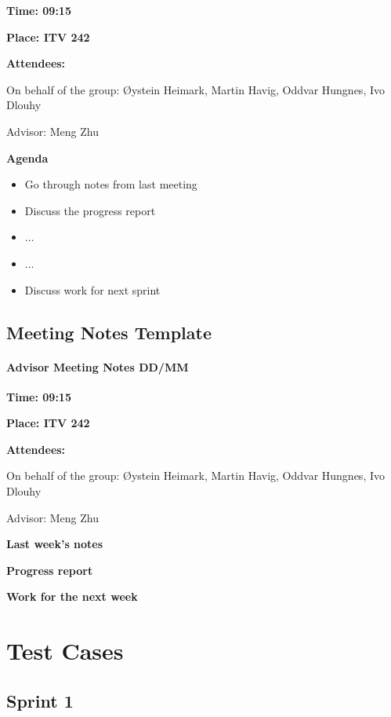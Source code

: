\textbf{Time: 09:15}

\textbf{Place: ITV 242}

\textbf{Attendees:}

On behalf of the group: Øystein Heimark, Martin Havig, Oddvar Hungnes, Ivo Dlouhy

Advisor: Meng Zhu

\textbf{Agenda}
\begin{itemize}
\item Go through notes from last meeting
\item Discuss the progress report
\item ...
\item ...
\item Discuss work for next sprint
\end{itemize}

\section{Meeting Notes Template}
\label{meetingnotestemplate}

\subsubsection{Advisor Meeting Notes DD/MM}

\textbf{Time: 09:15}

\textbf{Place: ITV 242}

\textbf{Attendees:}

On behalf of the group: Øystein Heimark, Martin Havig, Oddvar Hungnes, Ivo Dlouhy

Advisor: Meng Zhu

\textbf{Last week's notes}

\textbf{Progress report}

\textbf{Work for the next week}

\chapter{Test Cases}
\section{Sprint 1}
\label{sec:sp1testcases}

